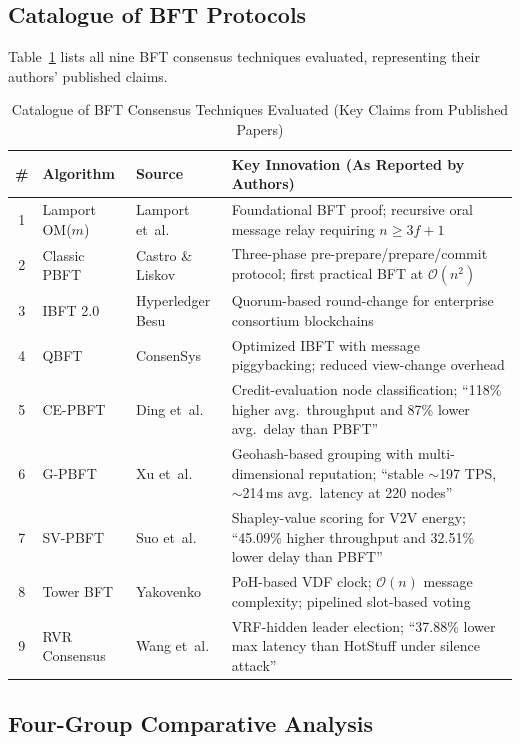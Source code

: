 \documentclass[10pt,twocolumn,letterpaper]{article}
\begin{document}
\begin{enumerate}[leftmargin=*]
\subsection{Catalogue of BFT Protocols}
Table~\ref{tab:catalogue} lists all nine BFT consensus techniques evaluated, representing their authors' published claims.
\begin{table}[t]
\caption{Catalogue of BFT Consensus Techniques Evaluated (Key Claims from Published Papers)}
\label{tab:catalogue}
\centering
\scriptsize
\begin{tabular}{@{}cllp{7cm}@{}}
\toprule
\textbf{\#} & \textbf{Algorithm} & \textbf{Source} & \textbf{Key Innovation (As Reported by Authors)} \\
\midrule
1 & Lamport OM($m$) & Lamport et~al.~\cite{lamport1982} & Foundational BFT proof; recursive oral message relay requiring $n \geq 3f+1$ \\
2 & Classic PBFT & Castro \& Liskov~\cite{castro1999} & Three-phase pre-prepare/prepare/commit protocol; first practical BFT at $\mathcal{O}(n^2)$ \\
3 & IBFT 2.0 & Hyperledger Besu & Quorum-based round-change for enterprise consortium blockchains \\
4 & QBFT & ConsenSys~\cite{li2020} & Optimized IBFT with message piggybacking; reduced view-change overhead \\
5 & CE-PBFT & Ding et~al.~\cite{ding2024} & Credit-evaluation node classification; ``118\% higher avg.\ throughput and 87\% lower avg.\ delay than PBFT'' \\
6 & G-PBFT & Xu et~al.~\cite{xu2025} & Geohash-based grouping with multi-dimensional reputation; ``stable $\sim$197 TPS, $\sim$214\,ms avg.\ latency at 220 nodes'' \\
7 & SV-PBFT & Suo et~al.~\cite{suo2025} & Shapley-value scoring for V2V energy; ``45.09\% higher throughput and 32.51\% lower delay than PBFT'' \\
8 & Tower BFT & Yakovenko~\cite{yakovenko2018} & PoH-based VDF clock; $\mathcal{O}(n)$ message complexity; pipelined slot-based voting \\
9 & RVR Consensus & Wang et~al.~\cite{wang2025} & VRF-hidden leader election; ``37.88\% lower max latency than HotStuff under silence attack'' \\
\bottomrule
\end{tabular}
\end{table}

\subsection{Four-Group Comparative Analysis}

\end{enumerate}
\end{document}
